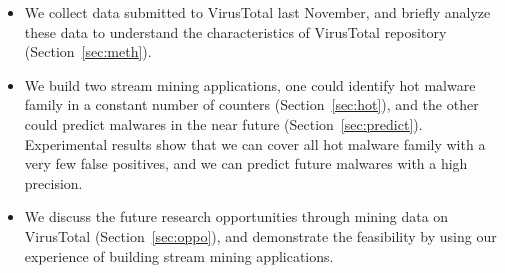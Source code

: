 \begin{itemize}

\item We collect data submitted to VirusTotal last November, 
and briefly analyze these data to understand the characteristics of VirusTotal repository (Section~\ref{sec:meth}). 
\item We build two stream mining applications, one could identify hot malware family in a constant number of counters (Section~\ref{sec:hot}), 
and the other could predict malwares in the near future (Section~\ref{sec:predict}). 
Experimental results show that we can cover all hot malware family with a very few false positives, and we can predict future malwares with a high precision.
\item We discuss the future research opportunities through mining data on VirusTotal (Section~\ref{sec:oppo}), 
and demonstrate the feasibility by using our experience of building stream mining applications. 

\end{itemize}




